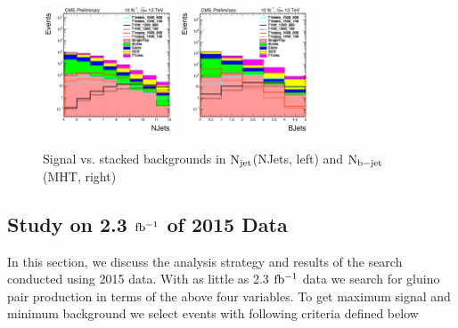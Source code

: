 \begin{figure}[h]
\begin{center}
\includegraphics[width=0.35\textwidth]{NJets_distribution.png}
\includegraphics[width=0.35\textwidth]{BJets_distribution.png}
\caption{\label{fig:SigvsBkgSearchVariables2} Signal vs. stacked backgrounds in $\rm N_{jet}$(NJets, left) and $\rm N_{b-jet}$(MHT, right)}
\end{center}
\end{figure}


\subsection{Study on 2.3 $\rm fb^{-1}$ of 2015 Data}

In this section, we discuss the analysis strategy and results of the search conducted using 2015 data. With as little as 
2.3 $\rm fb^{-1}$ data we search for gluino pair production in terms of the above four variables. To get maximum signal and minimum background we select events with following criteria defined below

